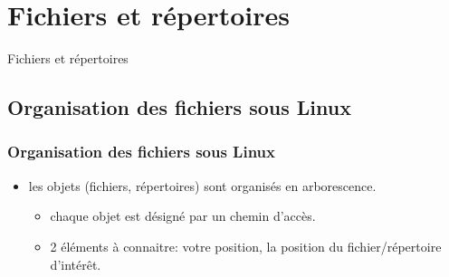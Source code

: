 \documentclass[10pt, xcolor=dvipsnames]{beamer}
\begin{document}


\section{Fichiers et répertoires}

\frame
{
\begin{block}{}
\begin{center}
\begin{huge}
Fichiers et répertoires
 \end{huge}
\end{center}
\end{block}

}

\subsection{Organisation des fichiers sous Linux}

\begin{frame}[fragile]
    \frametitle{Organisation des fichiers sous Linux}
    \begin{itemize}
    \item les objets (fichiers, répertoires) sont organisés en arborescence.
        \begin{itemize}
        \item chaque objet est désigné par un chemin d'accès.
        \item 2 éléments à connaitre: votre position, la position du fichier/répertoire d'intérêt.
        \end{itemize}
    \end{itemize}
\end{frame}
\end{document}
